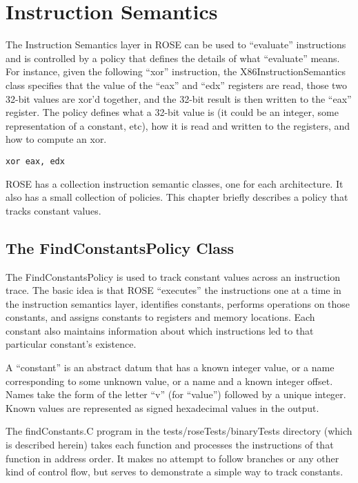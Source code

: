 \chapter{Instruction Semantics}

The Instruction Semantics layer in ROSE can be used to ``evaluate''
instructions and is controlled by a policy that defines the details of
what ``evaluate'' means.  For instance, given the following ``xor''
instruction, the X86InstructionSemantics class specifies that the
value of the ``eax'' and ``edx'' registers are read, those two 32-bit
values are xor'd together, and the 32-bit result is then written to
the ``eax'' register. The policy defines what a 32-bit value is (it
could be an integer, some representation of a constant, etc), how it
is read and written to the registers, and how to compute an xor.

\begin{verbatim}
xor eax, edx
\end{verbatim}

ROSE has a collection instruction semantic classes, one for each
architecture. It also has a small collection of policies.  This
chapter briefly describes a policy that tracks constant values.

\section{The FindConstantsPolicy Class}

The FindConstantsPolicy is used to track constant values across an
instruction trace.  The basic idea is that ROSE ``executes'' the
instructions one at a time in the instruction semantics layer,
identifies constants, performs operations on those constants, and
assigns constants to registers and memory locations.  Each constant
also maintains information about which instructions led to that
particular constant's existence.

A ``constant'' is an abstract datum that has a known integer value, or
a name corresponding to some unknown value, or a name and a known
integer offset. Names take the form of the letter ``v'' (for
``value'') followed by a unique integer.  Known values are represented
as signed hexadecimal values in the output.

The findConstants.C program in the tests/roseTests/binaryTests
directory (which is described herein) takes each function and
processes the instructions of that function in address order. It makes
no attempt to follow branches or any other kind of control flow, but
serves to demonstrate a simple way to track constants.


